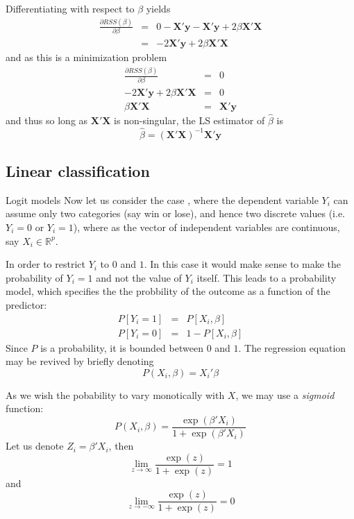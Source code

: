 \documentclass{beamer}
\begin{document}
\begin{frame}
Differentiating with respect to $\beta$ yields
\begin{eqnarray*}
\frac{\partial RSS(\beta)}{\partial \beta}&=&0-\bm{X'y}-\bm{X'y}+2\beta \bm{X'X}\\
&=&-2\bm{X'y}+2\beta \bm{X'X}
\end{eqnarray*}
and as this is a minimization problem 
\begin{eqnarray*}
\frac{\partial RSS(\beta)}{\partial \beta}&=&0\\
-2\bm{X'y}+2\beta \bm{X'X}&=&0\\
\beta \bm{X'X}&=&\bm{X'y}
\end{eqnarray*}
and thus so long as $\bm{X'X}$ is non-singular, the LS estimator of $\hat{\beta}$ is
\begin{equation}
\hat{\beta}=(\bm{X'X})^{-1}\bm{X'y}
\end{equation}
\end{frame}
\subsection{Linear classification}
\begin{frame}{Logit models}
Now let us consider the case , where the dependent variable $Y_i$ can assume only two categories (say win or lose), and hence two discrete values (i.e. $Y_i=0$ or $Y_i=1$), where as the vector of independent variables are continuous, say $X_i\in\mathbb{R}^p$.

In order to restrict $Y_i$ to $0$ and $1$. In this case it would make sense to make the probability of $Y_i=1$ and not the value of $Y_i$ itself.  This leads to a probability model, which specifies the the probbility of the outcome as a function of the predictor:
\begin{eqnarray}
P[Y_i=1]&=&P[X_i,\beta]\\
P[Y_i=0]&=&1-P[X_i,\beta]
\end{eqnarray}
Since $P$ is a probability, it is bounded between $0$ and $1$. The regression equation may be revived by briefly denoting
\[
P(X_i,\beta)=X_i'\beta
\]
\end{frame}

\begin{frame}
As we wish the pobability to vary monotically with $X$, we may use a \textit{sigmoid} function:
\begin{equation}
P(X_i,\beta)=\frac{\exp(\beta'X_i)}{1+\exp(\beta'X_i)}
\end{equation}
Let us denote $Z_i=\beta'X_i$, then
\[
\lim_{z\rightarrow\infty}\frac{\exp(z)}{1+\exp(z)}=1
\]
and
\[
\lim_{z\rightarrow-\infty}\frac{\exp(z)}{1+\exp(z)}=0
\]
\end{frame}
\end{document}
